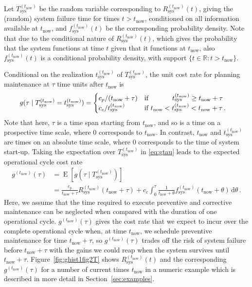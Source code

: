 \documentclass[authoryear]{elsarticle}
\newcommand{\reals}{\mathbb{R}}
\newcommand{\dd}{\,\mathrm{d}}
\newcommand{\E}{\operatorname{E}}
\def\tnow{t_\text{now}}
\newcommand{\Rsysnow}{R^{(t_\text{now})}_\text{sys}}
\newcommand{\Tsysnow}{T^{(t_\text{now})}_\text{sys}}
\newcommand{\tsysnow}{t^{(t_\text{now})}_\text{sys}}
\newcommand{\fsysnow}{f^{(t_\text{now})}_\text{sys}}
\newcommand{\gnow}{g^{(\tnow)}}
\begin{document}
Let $\Tsysnow$ be the random variable corresponding to $\Rsysnow(t)$,
giving the (random) system failure time for times $t > \tnow$,
conditioned on all information available at $\tnow$,
and $\fsysnow(t)$ be the corresponding probability density.
Note that due to the conditional nature of $\Rsysnow(t)$,
which gives the probability that the system functions at time $t$ given that it functions at $\tnow$,
also $\fsysnow(t)$ is a conditional probability density,
with support $\{t \in \reals : t > \tnow \}$.

Conditional on the realization $\tsysnow$ of $\Tsysnow$, the unit cost rate 
for planning maintenance at $\tau$ time units after $\tnow$ is 
\begin{align}
g(\tau \mid \Tsysnow = \tsysnow) &=
\begin{cases}
c_p / (\tnow + \tau) & \text{if } \hspace{7.4ex} \tsysnow \ge \tnow + \tau \\
c_c /  \tsysnow      & \text{if }        \tnow < \tsysnow  <  \tnow + \tau \,.
\end{cases}
\label{eq:gtau}
\end{align}
Note that here, $\tau$ is a time span starting from $\tnow$,
and so is a time on a prospective time scale, where $0$ corresponds to $\tnow$.
In contrast, $\tnow$ and $\tsysnow$ are times on an absolute time scale,
where $0$ corresponds to the time of system start-up.
Taking the expectation over $\Tsysnow$ in \eqref{eq:gtau} leads to the expected operational cycle cost rate
\begin{align}
\gnow(\tau) &= \E[g(\tau \mid \Tsysnow)] \nonumber\\ 
            &= \frac{c_p}{\tnow + \tau} \Rsysnow(\tnow + \tau)
              + c_c \int_0^\tau \frac{1}{\tnow + \theta} \fsysnow(\tnow + \theta) \dd \theta\,.
\label{eq:gtnowtau}
\end{align}
Here, we assume that the time required to execute preventive and corrective maintenance
can be neglected when compared with the duration of one operational cycle.
%
$\gnow(\tau)$ gives the cost rate that we expect to incur over the complete operational cycle
when, at time $\tnow$, we schedule preventive maintenance for time $\tnow + \tau$,
so $\gnow(\tau)$ trades off the risk of system failure before $\tnow + \tau$
with the gains we could reap when the system survives until $\tnow + \tau$.
Figure~\ref{fig:ghist1fig2T} shows $\Rsysnow(t)$ and the corresponding $\gnow(\tau)$ for a number of current times $\tnow$
in a numeric example which is described in more detail in Section~\ref{sec:examples}.
\end{document}
